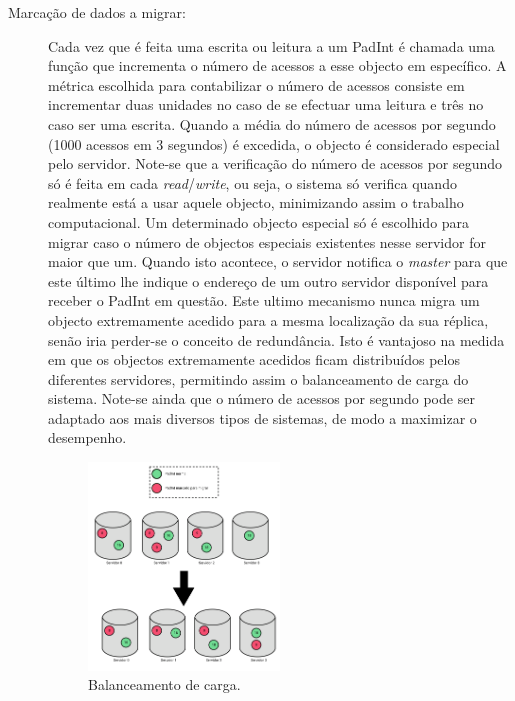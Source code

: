 \begin{description}
\item[Marcação de dados a migrar:]
Cada vez que é feita uma escrita ou leitura a um PadInt é chamada uma função que incrementa  o número de acessos a esse objecto em específico. A métrica escolhida para contabilizar o número de acessos consiste em incrementar duas unidades no caso de se efectuar uma leitura e três no caso ser uma escrita. Quando a média do número de acessos por segundo (1000 acessos em 3 segundos) é excedida, o objecto é considerado especial pelo servidor. Note-se que a verificação do número de acessos por segundo só é feita em cada \textit{read}/\textit{write}, ou seja, o sistema só verifica quando realmente está a usar aquele objecto, minimizando assim o trabalho computacional. Um determinado objecto especial só é escolhido para migrar caso o número de objectos especiais existentes nesse servidor for maior que um. Quando isto acontece, o servidor notifica o \textit{master} para que este último lhe indique o endereço de um outro servidor disponível para receber o PadInt em questão. Este ultimo mecanismo nunca migra um objecto extremamente acedido para a mesma localização da sua réplica, senão iria perder-se o conceito de redundância. Isto é vantajoso na medida em que os objectos extremamente acedidos ficam distribuídos pelos diferentes servidores, permitindo assim o balanceamento de carga do sistema. Note-se ainda que o número de acessos por segundo pode ser adaptado aos mais diversos tipos de sistemas, de modo a maximizar o desempenho.

\begin{figure}[htb]
\centering
\includegraphics[width=0.5\textwidth]{migracao.png}
\caption{\label{fig:migracao}Balanceamento de carga.}
\end{figure}


\end{description}
